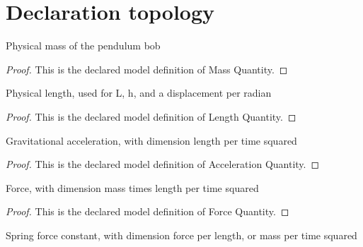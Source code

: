\section{Declaration topology}
\begin{definition}
  \label{def:physics:phyx-mini-0233:phyxminiproblems-problemphyxmini0233-massquantity}
  Physical mass of the pendulum bob
\end{definition}
\begin{proof}
  This is the declared model definition of Mass Quantity.
\end{proof}
\begin{definition}
  \label{def:physics:phyx-mini-0233:phyxminiproblems-problemphyxmini0233-lengthquantity}
  Physical length, used for L, h, and a displacement per radian
\end{definition}
\begin{proof}
  This is the declared model definition of Length Quantity.
\end{proof}
\begin{definition}
  \label{def:physics:phyx-mini-0233:phyxminiproblems-problemphyxmini0233-accelerationquantity}
  Gravitational acceleration, with dimension length per time squared
\end{definition}
\begin{proof}
  This is the declared model definition of Acceleration Quantity.
\end{proof}
\begin{definition}
  \label{def:physics:phyx-mini-0233:phyxminiproblems-problemphyxmini0233-forcequantity}
  Force, with dimension mass times length per time squared
\end{definition}
\begin{proof}
  This is the declared model definition of Force Quantity.
\end{proof}
\begin{definition}
  \label{def:physics:phyx-mini-0233:phyxminiproblems-problemphyxmini0233-springconstantquantity}
  Spring force constant, with dimension force per length, or mass per time squared
\end{definition}
